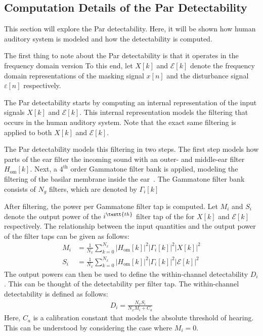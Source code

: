 \subsection{Computation Details of the Par Detectability}
\label{ch:perceptual:implementation:computation}
This section will explore the Par detectability.
Here, it will be shown how human auditory system is modeled and how the detectability is computed.

The first thing to note about the Par detectability is that it operates in the frequency domain version 
To this end, let $X[k]$ and $\mathcal{E}[k]$ denote the frequency domain representations of the masking signal $x[n]$ and 
the disturbance signal $\varepsilon[n]$ respectively.

The Par detectability starts by computing an internal representation of the input signals $X[k]$ and $\mathcal{E}[k]$.
This internal representation models the filtering that occurs in the human auditory system.
Note that the exact same filtering is applied to both $X[k]$ and $\mathcal{E}[k]$.

The Par detectability models this filtering in two steps.
The first step models how parts of the ear filter the incoming sound with an outer- and middle-ear filter $H_\text{om}[k]$. 
Next, a $4^\text{th}$ order Gammatone filter bank is applied, modeling the filtering of the 
basilar membrane inside the ear~\cite{van2005perceptual}.
The Gammatone filter bank consists of $N_g$ filters, which are denoted by $\Gamma_i[k]$ 

After filtering, the power per Gammatone filter tap is computed.
Let $M_i$ and $S_i$ denote the output power of the $i^\textt{th}$ filter tap of the for $X[k]$ and 
$\mathcal{E}[k]$ respectively.
The relationship between the input quantities and the output power of the filter taps can be given as follows:
\begin{align}
    M_i &= \frac{1}{N_x}\sum_{k=0}^{N_x}\left|H_\text{om}[k]\right|^2\left|\Gamma_i[k]\right|^2\left|X[k]\right|^2 \\
    S_i &= \frac{1}{N_x}\sum_{k=0}^{N_x}\left|H_\text{om}[k]\right|^2\left|\Gamma_i[k]\right|^2\left|\mathcal{E}[k]\right|^2 
\end{align}
The output powers can then be used to define the within-channel detectability $D_i$.
This can be thought of the detectability per filter tap.
The within-channel detectability is defined as follows:
\begin{align}
    D_i = \frac{N_xS_i}{N_xM_i + C_a}
\end{align}
Here, $C_a$ is a calibration constant that models the absolute threshold of hearing.
This can be understood by considering the case where $M_i = 0$.

